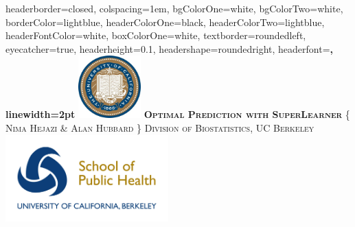 \documentclass[landscape,a0paper,fontscale=0.285]{baposter} %
\begin{document}
\begin{poster}
{
headerborder=closed, %
colspacing=1em, %
bgColorOne=white, %
bgColorTwo=white, %
borderColor=lightblue, %
headerColorOne=black, %
headerColorTwo=lightblue, %
headerFontColor=white, %
boxColorOne=white, %
textborder=roundedleft, %
eyecatcher=true, %
headerheight=0.1\textheight, %
headershape=roundedright, %
headerfont=\Large\bf\textsc, %
linewidth=2pt %
}
%
{\includegraphics[height=6.5em]{logo_cal.jpg}} %
{\bf\textsc{Optimal Prediction with SuperLearner}\vspace{0.5em}} %
{\textsc{\{ Nima Hejazi \& Alan Hubbard \} \hspace{12pt} Division of Biostatistics, UC Berkeley}}
{\includegraphics[height=9em]{logo_sph.jpg}} %


\end{poster}
\end{document}
